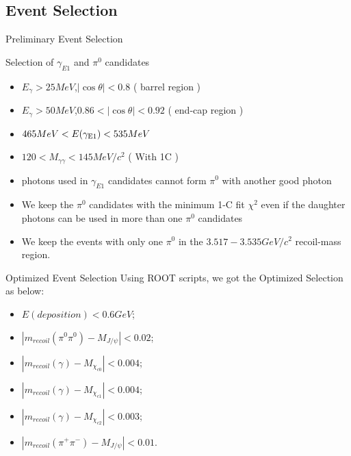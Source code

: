 \documentclass{beamer}
\begin{document}
\subsection{Event Selection}
\begin{frame}{Preliminary Event Selection}
\begin{block}{Selection of $\gamma_{E1}$ and $\pi^0$ candidates}
\begin{itemize}
\item $E_{\gamma}>25 MeV$,$|\cos\theta|<0.8$ ( barrel region )
\item $E_{\gamma}>50 MeV$,$0.86<|\cos\theta|<0.92$ ( end-cap region )
\item $465MeV < E({\gamma}_{{\rm E1}}) < 535MeV$
\item $120<M_{\gamma \gamma}<145 MeV/c^2$ ( With 1C )
\item photons used in $\gamma_{E1}$ candidates cannot form $\pi^0$ with another good photon
\item We keep the $\pi^0$ candidates with the minimum 1-C fit $\chi^2$ even if the daughter photons can be used in more than one $\pi^0$ candidates
\item We keep the events with only one $\pi^0$ in the $3.517-3.535GeV/c^2$ recoil-mass region.
\end{itemize}
\end{block}
\end{frame}
\begin{frame}{Optimized Event Selection}
Using ROOT scripts, we got the Optimized Selection as below:
\begin{itemize}
\item $E(deposition)<0.6GeV$;
\item $|m_{recoil}(\pi^0 \pi^0)-M_{J/\psi}|<0.02$;
\item $|m_{recoil}(\gamma)-M_{\chi_{c0}}|<0.004$;
\item $|m_{recoil}(\gamma)-M_{\chi_{c1}}|<0.004$;
\item $|m_{recoil}(\gamma)-M_{\chi_{c2}}|<0.003$;
\item $|m_{recoil}(\pi^+ \pi^-)-M_{J/\psi}|<0.01$.
\end{itemize}
\end{frame}

\end{document}
